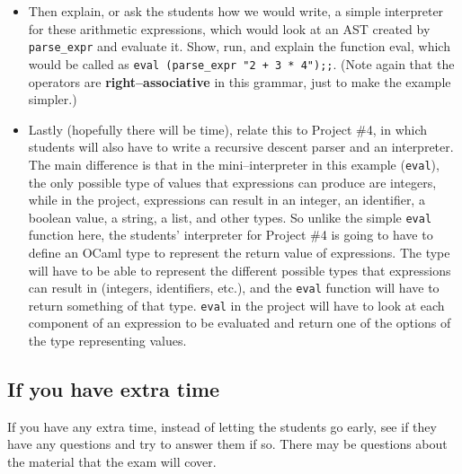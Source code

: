 \documentclass[12pt]{article}
\begin{document}
\begin{itemize}
        \item Then explain, or ask the students how we would write, a simple
              interpreter for these arithmetic expressions, which would look
              at an AST created by \texttt{parse\_expr} and evaluate it.
              Show, run, and explain the function eval, which would be
              called as \texttt{eval (parse\_expr "2 + 3 * 4");;}.  (Note
              again that the operators are \textbf{right--associative} in
              this grammar, just to make the example simpler.)

        \item Lastly (hopefully there will be time), relate this to Project
              \#4, in which students will also have to write a recursive
              descent parser and an interpreter.  The main difference is
              that in the mini--interpreter in this example (\texttt{eval}),
              the only possible type of values that expressions can produce
              are integers, while in the project, expressions can result in
              an integer, an identifier, a boolean value, a string, a list,
              and other types.  So unlike the simple \texttt{eval} function
              here, the students' interpreter for Project \#4 is going to
              have to define an OCaml type to represent the return value of
              expressions.  The type will have to be able to represent the
              different possible types that expressions can result in
              (integers, identifiers, etc.), and the \texttt{eval} function
              will have to return something of that type.  \texttt{eval} in
              the project will have to look at each component of an
              expression to be evaluated and return one of the options of
              the type representing values.

      \end{itemize}

      \vspace{-2.5mm}

    \subsection{If you have extra time}

      If you have any extra time, instead of letting the students go early,
    see if they have any questions and try to answer them if so.  There may
    be questions about the material that the exam will cover.
\end{document}
